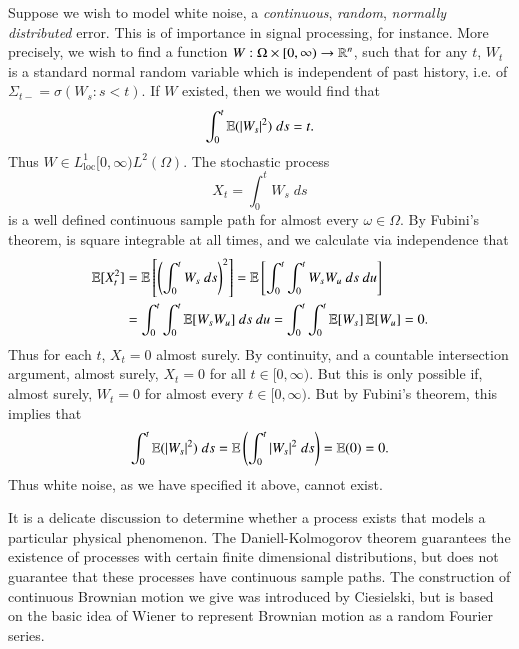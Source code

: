 \begin{example}
    Suppose we wish to model white noise, a \emph{continuous}, \emph{random}, \emph{normally distributed} error. This is of importance in signal processing, for instance. More precisely, we wish to find a function $W: \Omega \times [0,\infty) \to \operatorname{\mathbb{R}}^n$, such that for any $t$, $W_t$ is a standard normal random variable which is independent of past history, i.e. of $\Sigma_{t-} = \sigma(W_s: s < t)$. If $W$ existed, then we would find that
    \[ \int_0^t \operatorname{\mathbb{E}} (|W_s|^2)\; ds = t. \]
    Thus $W \in L^1_{\text{loc}}[0,\infty) L^2(\Omega)$. The stochastic process
    \[ X_t = \int_0^t W_s\; ds \]
    is a well defined continuous sample path for almost every $\omega \in \Omega$. By Fubini's theorem, is square integrable at all times, and we calculate via independence that
    \begin{align*}
        \operatorname{\mathbb{E}}[X_t^2] &= \operatorname{\mathbb{E}} \left[ \left( \int_0^t W_s\ ds \right)^2 \right] = \operatorname{\mathbb{E}} \left[ \int_0^t \int_0^t W_sW_u\ ds\ du \right]\\
        &= \int_0^t \int_0^t \operatorname{\mathbb{E}}[W_sW_u]\ ds\ du = \int_0^t \int_0^t \operatorname{\mathbb{E}}[W_s]\operatorname{\mathbb{E}}[W_u] = 0.
    \end{align*}
    Thus for each $t$, $X_t = 0$ almost surely. By continuity, and a countable intersection argument, almost surely, $X_t = 0$ for all $t \in [0,\infty)$. But this is only possible if, almost surely, $W_t = 0$ for almost every $t \in [0,\infty)$. But by Fubini's theorem, this implies that
    \[ \int_0^t \operatorname{\mathbb{E}}(|W_s|^2)\; ds = \operatorname{\mathbb{E}} \left( \int_0^t |W_s|^2\; ds \right) = \operatorname{\mathbb{E}}(0) = 0. \]
    Thus white noise, as we have specified it above, cannot exist.
\end{example}

It is a delicate discussion to determine whether a process exists that models a particular physical phenomenon. The Daniell-Kolmogorov theorem guarantees the existence of processes with certain finite dimensional distributions, but does not guarantee that these processes have continuous sample paths. The construction of continuous Brownian motion we give was introduced by Ciesielski, but is based on the basic idea of Wiener to represent Brownian motion as a random Fourier series.

